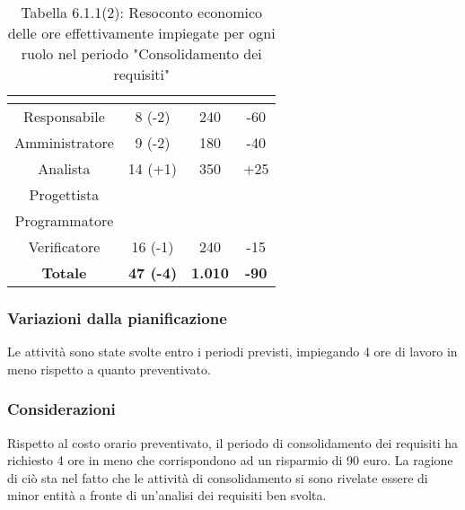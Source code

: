 \renewcommand{\arraystretch}{1.4}
\begin{table}[H]
\begin{center}
\begin{tabular}{|c|c|c|c|}
\hline
\rowcolor{title_row}
\textbf{\color{title_text}{Ruolo}}  & \textbf{\color{title_text}{Ore}} & \textbf{\color{title_text}{Costo in \euro}} & \textbf{\color{title_text}{Differenza al preventivo in \euro}} \\ \hline
Responsabile    & 8 (-2) & 240 & -60 \\ \hline
Amministratore  & 9 (-2) & 180 & -40 \\ \hline
Analista        & 14 (+1) & 350 & +25 \\ \hline
Progettista     & & &  \\ \hline
Programmatore   & & &  \\ \hline
Verificatore    & 16 (-1) & 240 & -15  \\ \hline
\textbf{Totale} & \textbf{47 (-4)}    & \textbf{1.010} & \textbf{-90} \\ \hline
\end{tabular}
\caption{Tabella 6.1.1(2): Resoconto economico delle ore effettivamente impiegate per ogni ruolo nel periodo "Consolidamento dei requisiti"\label{}}
\end{center}
\end{table}
\renewcommand{\arraystretch}{1}


\subsubsection{Variazioni dalla pianificazione}
Le attività sono state svolte entro i periodi previsti, impiegando 4 ore di lavoro in meno rispetto a quanto preventivato.

\subsubsection{Considerazioni}
Rispetto al costo orario preventivato, il periodo di consolidamento dei requisiti ha richiesto 4
ore in meno che corrispondono ad un risparmio di 90 euro. La ragione di ciò sta nel fatto che le attività di consolidamento si sono rivelate essere
di minor entità a fronte di un'analisi dei requisiti ben svolta.
\pagebreak
